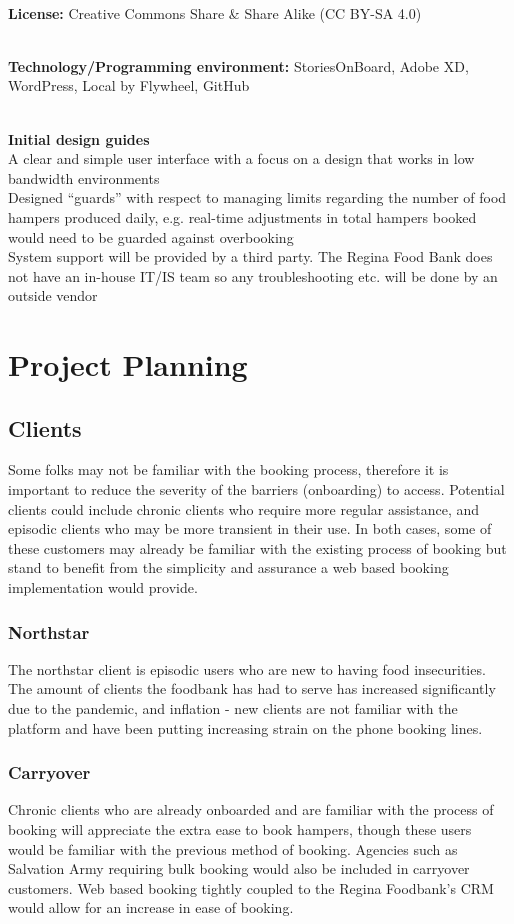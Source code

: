 \documentclass[english,course]{lecture}
\begin{document}
\\\textbf{License:} Creative Commons Share \& Share Alike (CC BY-SA 4.0)

\\\textbf{Technology/Programming environment:} StoriesOnBoard, Adobe XD, WordPress, Local by Flywheel, GitHub

\\\textbf{Initial design guides}
\\A clear and simple user interface with a focus on a design that works in low bandwidth environments
\\Designed “guards” with respect to managing limits regarding the number of food hampers produced daily, e.g. real-time adjustments in total hampers booked would need to be guarded against overbooking
\\System support will be provided by a third party. The Regina Food Bank does not have an in-house IT/IS team so any troubleshooting etc. will be done by an outside vendor

\section{Project Planning}
\subsection{Clients}
Some folks may not be familiar with the booking process, therefore it is important to reduce the severity of the barriers (onboarding) to access. Potential clients could include chronic clients who require more regular assistance, and episodic clients who may be more transient in their use. In both cases, some of these customers may already be familiar with the existing process of booking but stand to benefit from the simplicity and assurance a web based booking implementation would provide.

\subsubsection{Northstar}
The northstar client is episodic users who are new to having food insecurities. The amount of clients the foodbank has had to serve has increased significantly due to the pandemic, and inflation - new clients are not familiar with the platform and have been putting increasing strain on the phone booking lines.

\subsubsection{Carryover}
Chronic clients who are already onboarded and are familiar with the process of booking will appreciate the extra ease to book hampers, though these users would be familiar with the previous method of booking. Agencies such as Salvation Army requiring bulk booking would also be included in carryover customers. Web based booking tightly coupled to the Regina Foodbank's CRM would allow for an increase in ease of booking.
\end{document}
